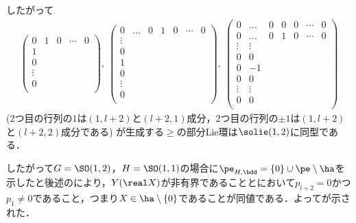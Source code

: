 \begin{npfwn}
  したがって
  \begin{align*}
    \begin{pmatrix}
      0 & 1 & 0 &  \cdots & 0\\
      1 &  &  &    &  \\
      0 &  &    &  &  \\
      \vdots &    &  &  &  \\
      0&  &  &    &  \\
    \end{pmatrix},\
    \begin{pmatrix}
      0 & \hdots & 0 & 1 & 0 &  \cdots & 0\\
      \vdots &  &  &    &  \\
      0 &  &    &  &  \\
      1 &  &    &  &  \\
      0 &  &    &  &  \\
      \vdots &    &  &  &  \\
      0&  &  &    &  \\
    \end{pmatrix},\
    \begin{pmatrix}
      0 & \hdots & 0 & 0 & 0 &  \cdots & 0\\
      0 & \hdots & 0 & 1 & 0 &  \cdots & 0\\
      \vdots & \vdots &  &    &  \\
      0 & 0 &    &  &  \\
      0 &-1  &    &  &  \\
      0 & 0 &    &  &  \\
      \vdots & \vdots   &  &  &  \\
      0& 0 &  &    &  \\
    \end{pmatrix}
  \end{align*}
  (2つ目の行列の1は$(1,l+2)$と$(l+2,1)$成分，2つ目の行列の$\pm 1$は$(1,l+2)$と$(l+2,2)$成分である) が生成する$\ge$の部分Lie環は$\solie(1,2) $に同型である．

  したがって$G = \SO(1,2) $，$H = \SO(1,1) $の場合に$\pe_{H,\bdd} = \{0\}\cup \pe\setminus\ha $を示したと後述のにより，$Y(\real X)$が非有界であることとにおいて$p_{l+2} = 0$かつ$p_1 \neq 0$であること，つまり$X\in \ha\setminus\{0\} $であることが同値である．よってが示された．
\end{npfwn}
  

